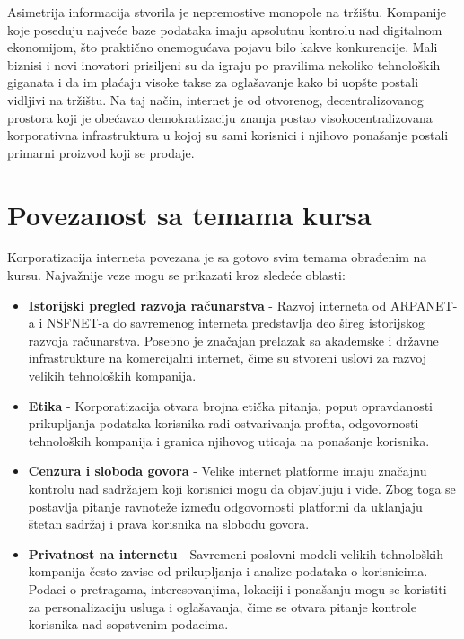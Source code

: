 \documentclass[12pt,a4paper]{article}
\begin{document}
Asimetrija informacija stvorila je nepremostive monopole na tržištu. Kompanije koje poseduju najveće baze podataka imaju apsolutnu kontrolu nad digitalnom ekonomijom, što praktično onemogućava pojavu bilo kakve konkurencije. Mali biznisi i novi inovatori prisiljeni su da igraju po pravilima nekoliko tehnoloških giganata i da im plaćaju visoke takse za oglašavanje kako bi uopšte postali vidljivi na tržištu. Na taj način, internet je od otvorenog, decentralizovanog prostora koji je obećavao demokratizaciju znanja postao visokocentralizovana korporativna infrastruktura u kojoj su sami korisnici i njihovo ponašanje postali primarni proizvod koji se prodaje.

\section{Povezanost sa temama kursa}

Korporatizacija interneta povezana je sa gotovo svim temama obrađenim na kursu. Najvažnije veze mogu se prikazati kroz sledeće oblasti:

\begin{itemize}

    \item \textbf{Istorijski pregled razvoja računarstva} - Razvoj interneta od
    ARPANET-a i NSFNET-a do savremenog interneta predstavlja deo šireg istorijskog
    razvoja računarstva. Posebno je značajan prelazak sa akademske i državne
    infrastrukture na komercijalni internet, čime su stvoreni uslovi za razvoj
    velikih tehnoloških kompanija.

    \item \textbf{Etika} - Korporatizacija otvara brojna etička pitanja, poput
    opravdanosti prikupljanja podataka korisnika radi ostvarivanja profita,
    odgovornosti tehnoloških kompanija i granica njihovog uticaja na ponašanje
    korisnika.

    \item \textbf{Cenzura i sloboda govora} - Velike internet platforme imaju
    značajnu kontrolu nad sadržajem koji korisnici mogu da objavljuju i vide.
    Zbog toga se postavlja pitanje ravnoteže između odgovornosti platformi da
    uklanjaju štetan sadržaj i prava korisnika na slobodu govora.

    \item \textbf{Privatnost na internetu} - Savremeni poslovni modeli velikih tehnoloških kompanija
    često zavise od prikupljanja i analize podataka o korisnicima. Podaci o
    pretragama, interesovanjima, lokaciji i ponašanju mogu se koristiti za
    personalizaciju usluga i oglašavanja, čime se otvara pitanje kontrole
    korisnika nad sopstvenim podacima.

\end{itemize}
\end{document}
